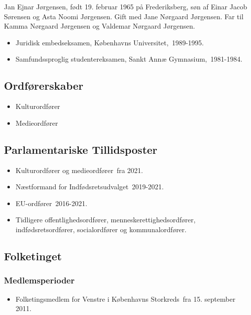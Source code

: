 \documentclass[11pt, a4paper]{awesome-cv}
\begin{document}
\makecvheader[R]
\makelettertitle
\begin{cvletter}
Jan Ejnar Jørgensen, født 19. februar 1965 på Frederiksberg, søn af Einar Jacob Sørensen og Asta Noomi Jørgensen. Gift med Jane Nørgaard Jørgensen. Far til Kamma Nørgaard Jørgensen og Valdemar Nørgaard Jørgensen.

\begin{itemize}
\item Juridisk embedseksamen, Københavns Universitet, 1989-1995.
\item Samfundssproglig studentereksamen, Sankt Annæ Gymnasium, 1981-1984.
\end{itemize}
\subsection*{Ordførerskaber}
\begin{itemize}
\item Kulturordfører
\item Medieordfører
\end{itemize}
\subsection*{Parlamentariske Tillidsposter}
\begin{itemize}
\item Kulturordfører og medieordfører fra 2021.
\item Næstformand for Indfødsretsudvalget 2019-2021.
\item EU-ordfører 2016-2021.
\item Tidligere offentlighedsordfører, menneskerettighedsordfører, indfødsretsordfører, socialordfører og kommunalordfører.
\end{itemize}
\subsection*{Folketinget}
\subsubsection*{Medlemsperioder}
\begin{itemize}
\item Folketingsmedlem for Venstre i Københavns Storkreds fra 15. september 2011.
\end{itemize}

\end{cvletter}
\end{document}
